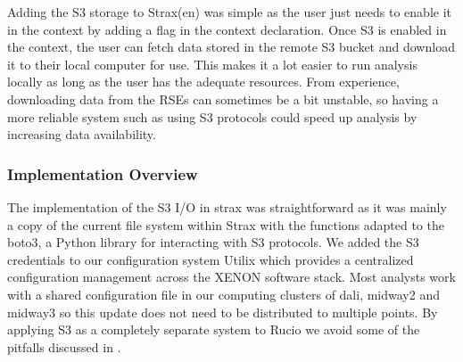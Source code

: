 Adding the S3 storage to Strax(en) was simple as the user just needs to enable it in the context by adding a flag in the context declaration. Once S3 is enabled in the context, the user can fetch data stored in the remote S3 bucket and download it to their local computer for use. This makes it a lot easier to run analysis locally as long as the user has the adequate resources. From experience, downloading data from the RSEs can sometimes be a bit unstable, so having a more reliable system such as using S3 protocols could speed up analysis by increasing data availability.


\subsubsection{Implementation Overview}


The implementation of the S3 I/O in strax was straightforward as it was mainly a copy of the current file system within Strax with the functions adapted to the boto3, a Python library for interacting with S3 protocols. 
We added the S3 credentials to our configuration system Utilix which provides a centralized configuration management across the XENON software stack. Most analysts work with a shared configuration file in our computing clusters of dali, midway2 and midway3 so this update does not need to be distributed to multiple points. By applying S3 as a completely separate system to Rucio we avoid some of the pitfalls discussed in \cite{Barisits2024}.

